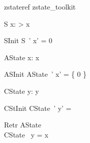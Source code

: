 
\begin{zsection}
   \SECTION zstateref \parents zstate\_toolkit
\end{zsection}

\zstate
\begin{schema}{S}
   x: \nat
{} > x
\end{schema}

\zstinit
\begin{schema}{SInit}
   S~'
\where
   x' = 0
\end{schema}

\zastate
\begin{schema}{AState}
   x: \power \nat
\where
  x \neq \emptyset
\end{schema}

\zastinit
\begin{schema}{ASInit}
   AState~'
\where
   x' = \{ 0 \}
\end{schema}

\zcstate
\begin{schema}{CState}
  y: \seq \nat
\where
   y \neq \langle \rangle
\end{schema}

\zcstinit
\begin{schema}{CStInit}
   CState~'
\where
  y' =  \rangle
\end{schema}

\zretrieve
\begin{schema}{Retr}
   AState \\
   CState
\where
   \ran~y = x
\end{schema}
